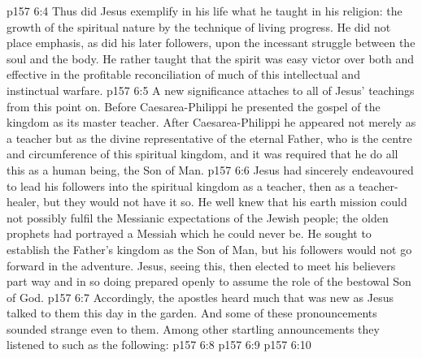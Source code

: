 \vs p157 6:4 Thus did Jesus exemplify in his life what he taught in his religion: the growth of the spiritual nature by the technique of living progress. He did not place emphasis, as did his later followers, upon the incessant struggle between the soul and the body. He rather taught that the spirit was easy victor over both and effective in the profitable reconciliation of much of this intellectual and instinctual warfare.
\vs p157 6:5 \pc A new significance attaches to all of Jesus’ teachings from this point on. Before Caesarea\hyp{}Philippi he presented the gospel of the kingdom as its master teacher. After Caesarea\hyp{}Philippi he appeared not merely as a teacher but as the divine representative of the eternal Father, who is the centre and circumference of this spiritual kingdom, and it was required that he do all this as a human being, the Son of Man.
\vs p157 6:6 Jesus had sincerely endeavoured to lead his followers into the spiritual kingdom as a teacher, then as a teacher\hyp{}healer, but they would not have it so. He well knew that his earth mission could not possibly fulfil the Messianic expectations of the Jewish people; the olden prophets had portrayed a Messiah which he could never be. He sought to establish the Father’s kingdom as the Son of Man, but his followers would not go forward in the adventure. Jesus, seeing this, then elected to meet his believers part way and in so doing prepared openly to assume the role of the bestowal Son of God.
\vs p157 6:7 Accordingly, the apostles heard much that was new as Jesus talked to them this day in the garden. And some of these pronouncements sounded strange even to them. Among other startling announcements they listened to such as the following:
\vs p157 6:8 \pc {}
\vs p157 6:9 \pc {}
\vs p157 6:10 \pc {}

